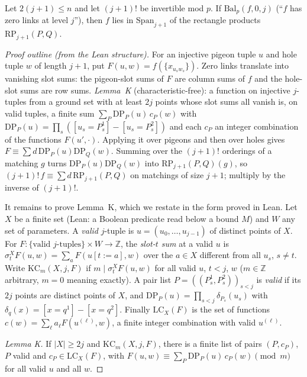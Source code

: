\begin{lemma}[$S_j$]\label{lem:SJ}
Let $2(j+1)\le n$ and let $(j+1)!$ be invertible mod $p$.  If
$\mathrm{Bal}_p(f,0,j)$ (``$f$ has zero links at level $j$''), then $f$ lies in
$\mathrm{Span}_{j+1}$ of the rectangle products
$\mathrm{RP}_{j+1}(P,Q)$.
\end{lemma}

\begin{proof}[Proof outline (from the Lean structure)]
For an injective pigeon tuple $u$ and hole tuple $w$ of length $j+1$, put
$F(u,w)=f(\{x_{u_sw_s}\})$.  Zero links translate into vanishing slot sums:
the pigeon-slot sums of $F$ are column sums of $f$ and the hole-slot sums are row
sums.  \emph{Lemma~K} (characteristic-free): a function on injective $j$-tuples
from a ground set with at least $2j$ points whose slot sums all vanish is, on
valid tuples, a finite sum $\sum_P \mathrm{DP}_P(u)\,c_P(w)$ with
$\mathrm{DP}_P(u)=\prod_s([u_s=P_s^1]-[u_s=P_s^2])$ and each $c_P$ an integer
combination of the functions $F(u',\cdot)$.
Applying it over pigeons and then over holes gives
$F\equiv\sum d\,\mathrm{DP}_P(u)\mathrm{DP}_Q(w)$.
Summing over the $(j+1)!$ orderings of a matching $g$ turns
$\mathrm{DP}_P(u)\mathrm{DP}_Q(w)$ into $\mathrm{RP}_{j+1}(P,Q)(g)$, so
$(j+1)!\,f\equiv\sum d\,\mathrm{RP}_{j+1}(P,Q)$ on matchings of size
$j+1$; multiply by the inverse of $(j+1)!$.

It remains to prove Lemma~K, which we restate in the form proved in Lean.  Let $X$ be a
finite set (Lean: a Boolean predicate read below a bound $M$) and $W$ any set of parameters.
A \emph{valid} $j$-tuple is $u=(u_0,\dots,u_{j-1})$ of distinct points of $X$.  For
$F\colon\{\text{valid $j$-tuples}\}\times W\to\mathbb Z$, the \emph{slot-$t$ sum} at a valid
$u$ is $\sigma^X_tF(u,w)=\sum_aF(u[t:=a],w)$ over the $a\in X$ different from all $u_s$,
$s\ne t$.  Write $\mathrm{KC}_m(X,j,F)$ if $m\mid\sigma^X_tF(u,w)$ for all valid $u$, $t<j$,
$w$ ($m\in\mathbb Z$ arbitrary, $m=0$ meaning exactly).  A pair list
$P=((P^1_s,P^2_s))_{s<j}$ is \emph{valid} if its $2j$ points are distinct points of $X$, and
$\mathrm{DP}_P(u)=\prod_{s<j}\delta_{P_s}(u_s)$ with $\delta_q(x)=[x=q^1]-[x=q^2]$.  Finally
$\mathrm{LC}_X(F)$ is the set of functions $c(w)=\sum_\ell a_\ell F(u^{(\ell)},w)$, a finite
integer combination with valid $u^{(\ell)}$.

\smallskip\noindent\emph{Lemma K.}  If $|X|\ge2j$ and $\mathrm{KC}_m(X,j,F)$, there is a finite
list of pairs $(P,c_P)$, $P$ valid and $c_P\in\mathrm{LC}_X(F)$, with
$F(u,w)\equiv\sum_P\mathrm{DP}_P(u)\,c_P(w)\pmod m$ for all valid $u$ and all
$w$.


\end{proof}
